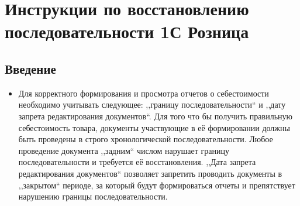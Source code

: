 \section{Инструкции по восстановлению последовательности 1С Розница}

\subsection{Введение}

\begin{itemize}
	\item Для корректного формирования и просмотра отчетов о себестоимости необходимо учитывать следующее: ,,границу последовательности`` и ,,дату запрета редактирования документов``. Для того что бы получить правильную себестоимость товара, документы участвующие в её формировании должны быть проведены в строго хронологической последовательности.
	Любое проведение документа ,,задним`` числом нарушает границу последовательности и требуется её восстановления. ,,Дата запрета редактирования документов`` позволяет запретить проводить документы в ,,закрытом`` периоде, за который будут формироваться отчеты и препятствует нарушению границы последовательности.
\end{itemize}	
